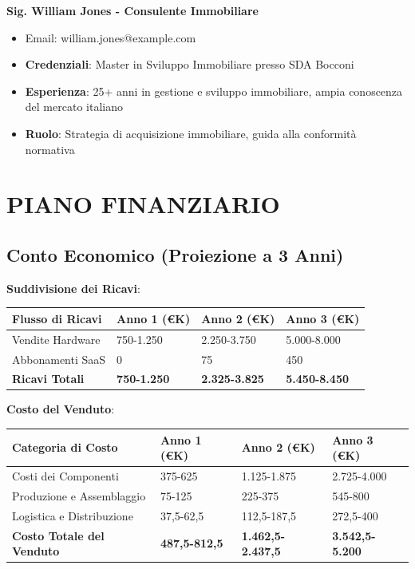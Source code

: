 \documentclass[11pt,a4paper]{report}
\begin{document}
\textbf{Sig. William Jones - Consulente Immobiliare}
\begin{itemize}
    \item Email: william.jones@example.com
    \item \textbf{Credenziali}: Master in Sviluppo Immobiliare presso SDA Bocconi
    \item \textbf{Esperienza}: 25+ anni in gestione e sviluppo immobiliare, ampia conoscenza del mercato italiano
    \item \textbf{Ruolo}: Strategia di acquisizione immobiliare, guida alla conformità normativa
\end{itemize}

\chapter{PIANO FINANZIARIO}

\section{Conto Economico (Proiezione a 3 Anni)}

\textbf{Suddivisione dei Ricavi}:

\begin{longtable}{|p{3cm}|p{2cm}|p{2cm}|p{2cm}|}
\hline
\textbf{Flusso di Ricavi} & \textbf{Anno 1 (€K)} & \textbf{Anno 2 (€K)} & \textbf{Anno 3 (€K)} \\ \hline
Vendite Hardware & 750-1.250 & 2.250-3.750 & 5.000-8.000 \\ \hline
Abbonamenti SaaS & 0 & 75 & 450 \\ \hline
\textbf{Ricavi Totali} & \textbf{750-1.250} & \textbf{2.325-3.825} & \textbf{5.450-8.450} \\ \hline
\end{longtable}

\textbf{Costo del Venduto}:

\begin{longtable}{|p{3cm}|p{2cm}|p{2cm}|p{2cm}|}
\hline
\textbf{Categoria di Costo} & \textbf{Anno 1 (€K)} & \textbf{Anno 2 (€K)} & \textbf{Anno 3 (€K)} \\ \hline
Costi dei Componenti & 375-625 & 1.125-1.875 & 2.725-4.000 \\ \hline
Produzione e Assemblaggio & 75-125 & 225-375 & 545-800 \\ \hline
Logistica e Distribuzione & 37,5-62,5 & 112,5-187,5 & 272,5-400 \\ \hline
\textbf{Costo Totale del Venduto} & \textbf{487,5-812,5} & \textbf{1.462,5-2.437,5} & \textbf{3.542,5-5.200} \\ \hline
\end{longtable}
\end{document}
